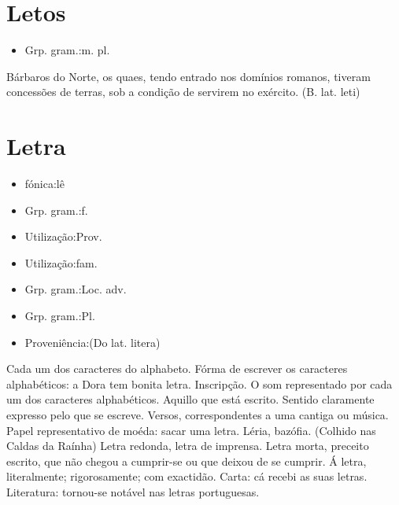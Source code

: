 \section{Letos}
\begin{itemize}
\item {Grp. gram.:m. pl.}
\end{itemize}
Bárbaros do Norte, os quaes, tendo entrado nos domínios romanos, tiveram concessões de terras, sob a condição de servirem no exército.
(B. lat. \textunderscore leti\textunderscore )
\section{Letra}
\begin{itemize}
\item {fónica:lê}
\end{itemize}
\begin{itemize}
\item {Grp. gram.:f.}
\end{itemize}
\begin{itemize}
\item {Utilização:Prov.}
\end{itemize}
\begin{itemize}
\item {Utilização:fam.}
\end{itemize}
\begin{itemize}
\item {Grp. gram.:Loc. adv.}
\end{itemize}
\begin{itemize}
\item {Grp. gram.:Pl.}
\end{itemize}
\begin{itemize}
\item {Proveniência:(Do lat. \textunderscore litera\textunderscore )}
\end{itemize}
Cada um dos caracteres do alphabeto.
Fórma de escrever os caracteres alphabéticos: \textunderscore a Dora tem bonita letra\textunderscore .
Inscripção.
O som representado por cada um dos caracteres alphabéticos.
Aquillo que está escrito.
Sentido claramente expresso pelo que se escreve.
Versos, correspondentes a uma cantiga ou música.
Papel representativo de moéda: \textunderscore sacar uma letra\textunderscore .
Léria, bazófia. (Colhido nas Caldas da Raínha)
\textunderscore Letra redonda\textunderscore , letra de imprensa.
\textunderscore Letra morta\textunderscore , preceito escrito, que não chegou a cumprir-se ou que deixou de se cumprir.
\textunderscore Á letra\textunderscore , literalmente; rigorosamente; com exactidão.
Carta: \textunderscore cá recebi as suas letras\textunderscore .
Literatura: \textunderscore tornou-se notável nas letras portuguesas\textunderscore .
